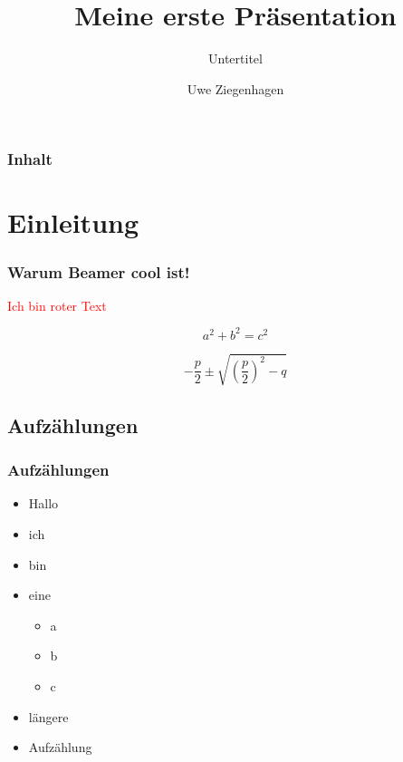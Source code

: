 \documentclass[12pt,ngerman]{beamer}
\author{Uwe Ziegenhagen}
\title{Meine erste Präsentation}
\subtitle{Untertitel}
\institute{Köln}
\begin{document}
\begin{frame}
\transboxout

\maketitle

\end{frame}

\begin{frame}
\frametitle{Inhalt}

\tableofcontents

\end{frame}

\section{Einleitung}


\begin{frame}
\transdissolve
\frametitle{Warum Beamer cool ist!}

\textcolor{red}{Ich bin roter Text}

\begin{equation}
a^2+b^2=c^2
\end{equation}

\pause

\begin{equation}
-\frac{p}{2} \pm \sqrt{ \left(\frac{p}{2}\right)^2 -q }
\end{equation}

\end{frame}

\subsection{Aufzählungen}

\begin{frame}
\frametitle{Aufzählungen}

\begin{itemize}
\item<2-> Hallo
\item<1> ich 
\item<1,3> bin
\item<4> eine

\begin{itemize}
	\item a
	\item b
	\item c
\end{itemize}

\item<2-> längere
\item<-3>Aufzählung
\end{itemize}
\end{frame}
\end{document}
